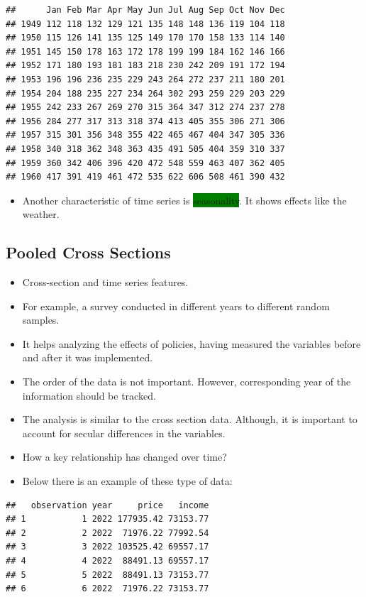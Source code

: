\documentclass[
]{book}
\providecommand{\tightlist}{%
  \setlength{\itemsep}{0pt}\setlength{\parskip}{0pt}}
\newcommand{\key}[1]{\colorbox{green}{#1}}
\theoremstyle{definition}
\theoremstyle{definition}
\theoremstyle{definition}
\theoremstyle{definition}
\theoremstyle{remark}
\begin{document}
\begin{verbatim}
##      Jan Feb Mar Apr May Jun Jul Aug Sep Oct Nov Dec
## 1949 112 118 132 129 121 135 148 148 136 119 104 118
## 1950 115 126 141 135 125 149 170 170 158 133 114 140
## 1951 145 150 178 163 172 178 199 199 184 162 146 166
## 1952 171 180 193 181 183 218 230 242 209 191 172 194
## 1953 196 196 236 235 229 243 264 272 237 211 180 201
## 1954 204 188 235 227 234 264 302 293 259 229 203 229
## 1955 242 233 267 269 270 315 364 347 312 274 237 278
## 1956 284 277 317 313 318 374 413 405 355 306 271 306
## 1957 315 301 356 348 355 422 465 467 404 347 305 336
## 1958 340 318 362 348 363 435 491 505 404 359 310 337
## 1959 360 342 406 396 420 472 548 559 463 407 362 405
## 1960 417 391 419 461 472 535 622 606 508 461 390 432
\end{verbatim}

\begin{itemize}
\tightlist
\item
  Another characteristic of time series is \key{seasonality}. It shows effects like the weather.
\end{itemize}

\subsection*{Pooled Cross Sections}\label{pooled-cross-sections}

\begin{itemize}
\item
  Cross-section and time series features.
\item
  For example, a survey conducted in different years to different random samples.
\item
  It helps analyzing the effects of policies, having measured the variables before and after it was implemented.
\item
  The order of the data is not important. However, corresponding year of the information should be tracked.
\item
  The analysis is similar to the cross section data. Although, it is important to account for secular differences in the variables.
\item
  How a key relationship has changed over time?
\item
  Below there is an example of these type of data:
\end{itemize}

\begin{verbatim}
##   observation year     price   income
## 1           1 2022 177935.42 73153.77
## 2           2 2022  71976.22 77992.54
## 3           3 2022 103525.42 69557.17
## 4           4 2022  88491.13 69557.17
## 5           5 2022  88491.13 73153.77
## 6           6 2022  71976.22 73153.77
\end{verbatim}
\end{document}
